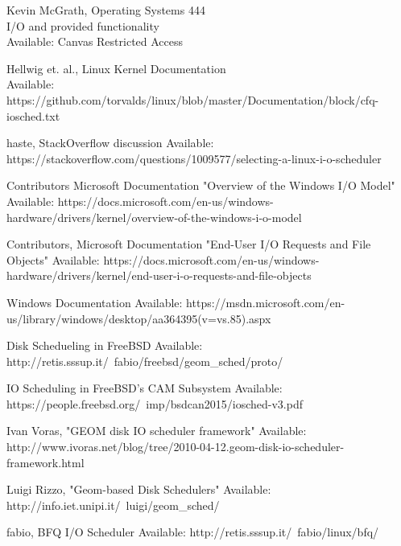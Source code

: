 \documentclass[letterpaper,10pt,notitlepage,fleqn]{article}
\begin{document}
\begin{thebibliography}{20}


    
    Kevin McGrath, Operating Systems 444 \\
    I/O and provided functionality \\
    Available: Canvas Restricted Access

    Hellwig et. al., Linux Kernel Documentation \\
    Available: https://github.com/torvalds/linux/blob/master/Documentation/block/cfq-iosched.txt

    haste, StackOverflow discussion
    Available: https://stackoverflow.com/questions/1009577/selecting-a-linux-i-o-scheduler



    Contributors Microsoft Documentation "Overview of the Windows I/O Model"
    Available: https://docs.microsoft.com/en-us/windows-hardware/drivers/kernel/overview-of-the-windows-i-o-model

    Contributors, Microsoft Documentation "End-User I/O Requests and File Objects"
    Available: https://docs.microsoft.com/en-us/windows-hardware/drivers/kernel/end-user-i-o-requests-and-file-objects

    Windows Documentation
    Available: https://msdn.microsoft.com/en-us/library/windows/desktop/aa364395(v=vs.85).aspx


    Disk Schedueling in FreeBSD
    Available: http://retis.sssup.it/~fabio/freebsd/geom\_sched/proto/

    IO Scheduling in FreeBSD's CAM Subsystem
    Available: https://people.freebsd.org/~imp/bsdcan2015/iosched-v3.pdf

    Ivan Voras, "GEOM disk IO scheduler framework"
    Available: http://www.ivoras.net/blog/tree/2010-04-12.geom-disk-io-scheduler-framework.html

    Luigi Rizzo, "Geom-based Disk Schedulers"
    Available: http://info.iet.unipi.it/~luigi/geom\_sched/

    fabio, BFQ I/O Scheduler
    Available: http://retis.sssup.it/~fabio/linux/bfq/

\end{thebibliography}

        
\end{document}
